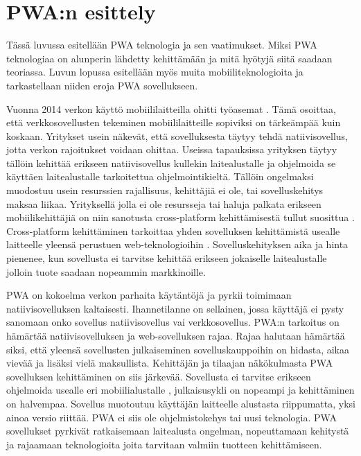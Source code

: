\documentclass{tktltiki}
\begin{document}
\newpage
\section{PWA:n esittely}

Tässä luvussa esitellään PWA teknologia ja sen vaatimukset. Miksi PWA teknologiaa on alunperin lähdetty kehittämään ja mitä hyötyjä siitä saadaan teoriassa. Luvun lopussa esitellään myös muita mobiiliteknologioita ja tarkastellaan niiden eroja PWA sovellukseen.

Vuonna 2014 verkon käyttö mobiililaitteilla ohitti työasemat \cite{tandelimpact}. Tämä osoittaa, että verkkosovellusten tekeminen mobiililaitteille sopiviksi on tärkeämpää kuin koskaan. Yritykset usein näkevät, että sovelluksesta täytyy tehdä natiivisovellus, jotta verkon rajoitukset voidaan ohittaa. Useissa tapauksissa yrityksen täytyy tällöin kehittää erikseen natiivisovellus kullekin laitealustalle ja ohjelmoida se käyttäen laitealustalle tarkoitettua ohjelmointikieltä. Tällöin ongelmaksi muodostuu usein resurssien rajallisuus, kehittäjiä ei ole, tai sovelluskehitys maksaa liikaa. Yrityksellä jolla ei ole resursseja tai haluja palkata erikseen mobiilikehittäjiä on niin sanotusta cross-platform kehittämisestä tullut suosittua \cite{biorn2017progressive}. Cross-platform kehittäminen tarkoittaa yhden sovelluksen kehittämistä usealle laitteelle yleensä perustuen web-teknologioihin \cite{heitkotter2013cross}. Sovelluskehityksen aika ja hinta pienenee, kun sovellusta ei tarvitse kehittää erikseen jokaiselle laitealustalle jolloin tuote saadaan nopeammin markkinoille.

PWA on kokoelma verkon parhaita käytäntöjä \cite{Kapoor} ja pyrkii toimimaan natiivisovelluksen kaltaisesti. Ihannetilanne on sellainen, jossa käyttäjä ei pysty sanomaan onko sovellus natiivisovellus vai verkkosovellus. PWA:n tarkoitus on hämärtää natiivisovelluksen ja web-sovelluksen rajaa. Rajaa halutaan hämärtää siksi, että yleensä sovellusten julkaiseminen sovelluskauppoihin on hidasta, aikaa vievää ja lisäksi vielä maksullista. Kehittäjän ja tilaajan näkökulmasta PWA sovelluksen kehittäminen on siis järkevää. Sovellusta ei tarvitse erikseen ohjelmoida usealle eri mobiilialustalle \cite{Gazdecki}, julkaisusykli on nopeampi ja kehittäminen on halvempaa. Sovellus muotoutuu käyttäjän laitteelle alustasta riippumatta, yksi ainoa versio riittää. PWA ei siis ole ohjelmistokehys tai uusi teknologia. PWA sovellukset pyrkivät ratkaisemaan laitealusta ongelman, nopeuttamaan kehitystä ja rajaamaan teknologioita joita tarvitaan valmiin tuotteen kehittämiseen.
\end{document}
